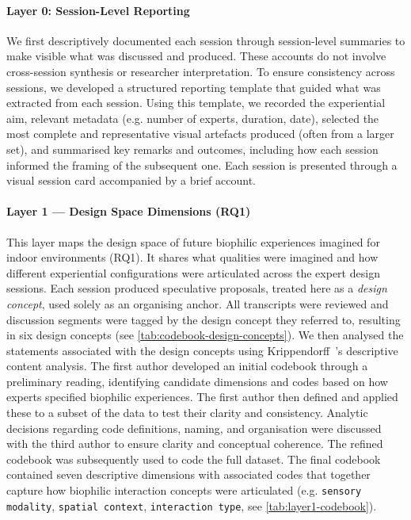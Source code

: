 \paragraph{Layer 0: Session-Level Reporting}
\label{subsec:ch5-layer0}
We first descriptively documented each session through session-level summaries to make visible what was discussed and produced. These accounts do not involve cross-session synthesis or researcher interpretation. To ensure consistency across sessions, we developed a structured reporting template that guided what was extracted from each session. Using this template, we recorded the experiential aim, relevant metadata (e.g. number of experts, duration, date), selected the most complete and representative visual artefacts produced (often from a larger set), and summarised key remarks and outcomes, including how each session informed the framing of the subsequent one. Each session is presented through a visual session card accompanied by a brief account.


\paragraph{Layer 1 — Design Space Dimensions (RQ1)}
\label{subsec:ch5-layer1}
This layer maps the design space of future biophilic experiences imagined for indoor environments (RQ1). It shares what qualities were imagined and how different experiential configurations were articulated across the expert design sessions. Each session produced speculative proposals, treated here as a \emph{design concept}, used solely as an organising anchor. All transcripts were reviewed and discussion segments were tagged by the design concept they referred to, resulting in six design concepts (see \autoref{tab:codebook-design-concepts}). We then analysed the statements associated with the design concepts using Krippendorff~\cite{krippendorff2018content}'s descriptive content analysis. The first author developed an initial codebook through a preliminary reading, identifying candidate dimensions and codes based on how experts specified biophilic experiences. The first author then defined and applied these to a subset of the data to test their clarity and consistency. Analytic decisions regarding code definitions, naming, and organisation were discussed with the third author to ensure clarity and conceptual coherence. The refined codebook was subsequently used to code the full dataset. The final codebook contained seven descriptive dimensions with associated codes that together capture how biophilic interaction concepts were articulated (e.g. \texttt{sensory modality}, \texttt{spatial context}, \texttt{interaction type}, see \autoref{tab:layer1-codebook}).

